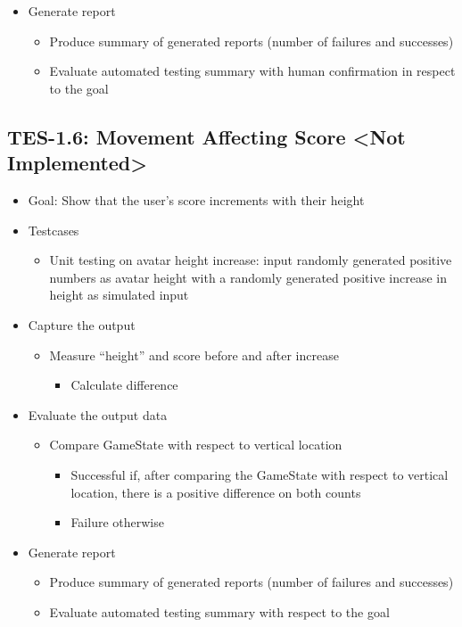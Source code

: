 \begin{itemize}
\item Generate report
\begin{itemize}
\item Produce summary of generated reports (number of failures and successes)
\item Evaluate automated testing summary with human confirmation in respect to the goal
\end{itemize}
\end{itemize}

\subsection{TES-1.6: Movement Affecting Score <Not Implemented>}
\label{subsec:movescore}
\begin{itemize}
\item Goal: Show that the user\textquoteright{}s score increments with their height

\item Testcases
\begin{itemize}
\item Unit testing on avatar height increase: input randomly generated positive numbers as avatar height with a randomly generated positive increase in height as simulated input
\end{itemize}

\item Capture the output
\begin{itemize}
\item Measure “height” and score before and after increase
\begin{itemize}
\item Calculate difference
\end{itemize}
\end{itemize}

\item Evaluate the output data
\begin{itemize}
\item Compare GameState with respect to vertical location
\begin{itemize}
\item Successful if, after comparing the GameState with respect to vertical location, there is a positive difference on both counts
\item Failure otherwise
\end{itemize}
\end{itemize}

\item Generate report
\begin{itemize}
\item Produce summary of generated reports (number of failures and successes)
\item Evaluate automated testing summary with respect to the goal
\end{itemize}
\end{itemize}

